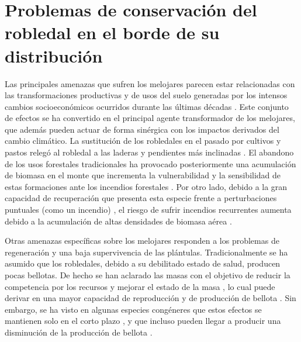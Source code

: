 \section{Problemas de conservación del robledal en el borde de su distribución}\label{sec:intro:problemas}

Las principales amenazas que sufren los melojares parecen estar relacionadas con las transformaciones productivas y de usos del suelo generadas por los intensos cambios socioeconómicos ocurridos durante las últimas décadas \autocites{Vericatetal2012GestionAdaptativa,PiqueVericat2015EvolutionPerspectives}. Este conjunto de efectos se ha convertido en el principal agente transformador de los melojares, que además pueden actuar de forma sinérgica con los impactos derivados del cambio climático. La sustitución de los robledales en el pasado por cultivos y pastos relegó al robledal a las laderas y pendientes más inclinadas \autocites{GarciaJimenez20099230Robledales,BlancoCastroetal2005BosquesIbericos,JimenezOlivenciaetal2015EvolucionUsos,Allue1997GestionRobledales}. El abandono de los usos forestales tradicionales ha provocado posteriormente una acumulación de biomasa en el monte que incrementa la vulnerabilidad y la sensibilidad de estas formaciones ante los incendios forestales \autocites{GarciaJimenez20099230Robledales,Allue1997GestionRobledales,Calvoetal1999PostfireSuccession}. Por otro lado, debido a la gran capacidad de recuperación que presenta esta especie frente a perturbaciones puntuales (como un incendio) \autocites{Calvoetal1999PostfireSuccession,Calvoetal2003RegenerationWildfire}, el riesgo de sufrir incendios recurrentes aumenta debido a la acumulación de altas densidades de biomasa aérea \autocites{Canellasetal2004GrowthResponse,Canellasetal2008SilvicultureCarbon}.

Otras amenazas específicas sobre los melojares responden a los problemas de regeneración y una baja supervivencia de las plántulas. Tradicionalmente se ha asumido que los robledales, debido a su debilitado estado de salud, producen pocas bellotas. De hecho se han aclarado las masas con el objetivo de reducir la competencia por los recursos y mejorar el estado de la masa \autocites{Canellasetal2004GrowthResponse,Aldeaetal2017ThinningEnhances,MorenoFernandezetal2020InfluenceClimate}, lo cual puede derivar en una mayor capacidad de reproducción y de producción de bellota \autocites{Bravoetal2008SelviculturaMontes}. Sin embargo, se ha visto en algunas especies congéneres que estos efectos se mantienen solo en el corto plazo \autocites{SanchezHumanesEspelta2011IncreasedDrought}, y que incluso pueden llegar a producir una disminución de la producción de bellota \autocites{Martiniketal2017EffectThinning}.

